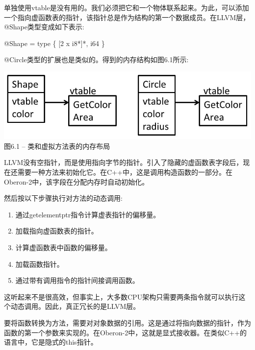 单独使用vtable是没有用的。我们必须把它和一个物体联系起来。为此，可以添加一个指向虚函数表的指针，该指针总是作为结构的第一个数据成员。在LLVM层，@Shape类型变成如下表示:\par

\begin{tcolorbox}[colback=white,colframe=black]
@Shape = type \{ [2 x i8*]*, i64 \}
\end{tcolorbox}

@Circle类型的扩展也是类似的。得到的内存结构如图6.1所示:\par

\hspace*{\fill} \par %
\begin{center}
	\includegraphics{content/2/chapter6/images/1.jpg}\\
	图6.1 – 类和虚拟方法表的内存布局
\end{center}

LLVM没有空指针，而是使用指向字节的指针。引入了隐藏的虚函数表字段后，现在还需要一种方法来初始化它。在C++中，这是调用构造函数的一部分。在Oberon-2中，该字段在分配内存时自动初始化。\par

然后按以下步骤执行对方法的动态调用:\par

\begin{enumerate}
	\item 通过getelementptr指令计算虚表指针的偏移量。
	\item 加载指向虚函数表的指针。
	\item 计算虚函数表中函数的偏移量。
	\item 加载函数指针。
	\item 通过带有调用指令的指针间接调用函数。
\end{enumerate}

这听起来不是很高效，但事实上，大多数CPU架构只需要两条指令就可以执行这个动态调用。因此，真正冗长的是LLVM层。\par

要将函数转换为方法，需要对对象数据的引用。这是通过将指向数据的指针，作为函数的第一个参数来实现的。在Oberon-2中，这就是显式接收器。在类似C++的语言中，它是隐式的this指针。\par

